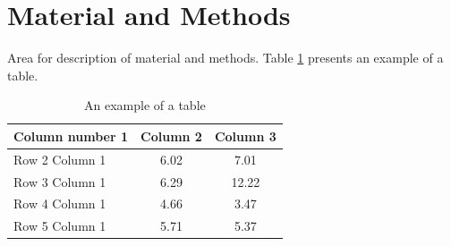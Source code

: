 \section{Material and Methods}
Area for description of material and methods. Table \ref{tab:example_methods} presents an example of a table.

\begin{table}[ht]
\centering
\caption{An example of a table}
\label{tab:example_methods}
\begin{tabular}{lcc}
\hline
\textbf{Column number 1} & \textbf{Column 2} & \textbf{Column 3} \\
\hline
Row 2 Column 1& 6.02 & 7.01 \\
Row 3 Column 1 & 6.29 & 12.22 \\
Row 4 Column 1 & 4.66 & 3.47 \\
Row 5 Column 1 & 5.71 & 5.37 \\
\hline
\end{tabular}
\end{table}
